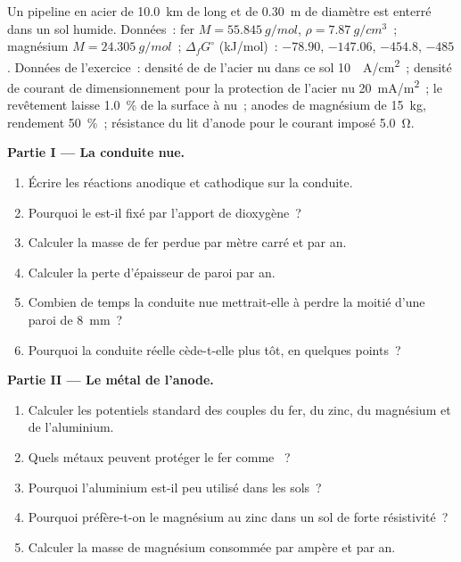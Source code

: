 \begin{problem}
\label{pb:b2:corrosion:1}
Un pipeline en acier de \qty{10.0}{km} de long et de \qty{0.30}{m} de diamètre est enterré dans
un sol humide. Données~: fer $M = \qty{55.845}{g/mol}$, $\rho = \qty{7.87}{g/cm^3}$~;
magnésium $M = \qty{24.305}{g/mol}$~; $\Delta_f G^\circ$ (\unit{kJ/mol})~: 
$-78.90$,  $-147.06$,  $-454.8$,  $-485$. Données de
l'exercice~: densité de  de l'acier nu dans ce sol \qty{10}{\micro
A/cm^2}~; densité de courant de dimensionnement pour la protection de l'acier nu
\qty{20}{mA/m^2}~; le revêtement laisse 1.0~\% de la surface à nu~; anodes de magnésium
de \qty{15}{kg}, rendement 50~\%~; résistance du lit d'anode pour le courant imposé
\qty{5.0}{\ohm}.

\medskip
\noindent\textbf{Partie I --- La conduite nue.}
\begin{enumerate}
  \item Écrire les réactions anodique et cathodique sur la conduite.
  \item Pourquoi le  est-il fixé par l'apport de dioxygène~?
  \item Calculer la masse de fer perdue par mètre carré et par an.
  \item Calculer la perte d'épaisseur de paroi par an.
  \item Combien de temps la conduite nue mettrait-elle à perdre la moitié d'une paroi de \qty{8}{mm}~?
  \item Pourquoi la conduite réelle cède-t-elle plus tôt, en quelques points~?
\end{enumerate}

\medskip
\noindent\textbf{Partie II --- Le métal de l'anode.}
\begin{enumerate}[resume]
  \item Calculer les potentiels standard des couples du fer, du zinc, du magnésium
        et de l'aluminium.
  \item Quels métaux peuvent protéger le fer comme ~?
  \item Pourquoi l'aluminium est-il peu utilisé dans les sols~?
  \item Pourquoi préfère-t-on le magnésium au zinc dans un sol de forte résistivité~?
  \item Calculer la masse de magnésium consommée par ampère et par an.
\end{enumerate}


\end{problem}
